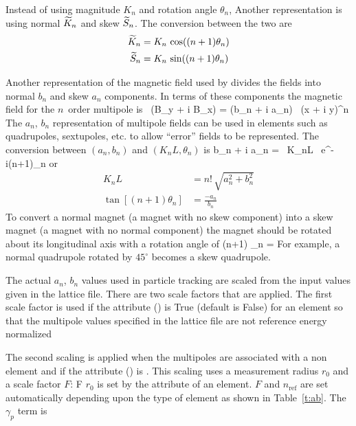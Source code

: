 Instead of using magnitude $K_n$ and rotation angle $\theta_n$,
Another representation is using normal $\widetilde K_n$ and skew $\widetilde
S_n$. The conversion between the two are
\begin{align}
  \widetilde K_n  &= K_n \, \cos((n + 1) \theta_n) \nonumber \\
  \widetilde S_n &= K_n \, \sin((n + 1) \theta_n) 
\end{align}

Another representation of the magnetic field used by \bmad divides
the fields into normal $b_n$ and skew $a_n$ components. In terms of
these components the magnetic field for the $n$\Th\ order multipole is
\Begineq
   \, (B_y + i B_x) = (b_n + i a_n) \, (x + i y)^n
  \label{qlpbb}
\Endeq
The $a_n$, $b_n$ representation of multipole fields can be used in elements such as
quadrupoles, sextupoles, etc. to allow ``error'' fields to be represented.  
The conversion between $(a_n, b_n)$ and $(K_nL, \theta_n)$ is
\Begineq
  b_n + i a_n =  \, K_nL \, e^{-i(n+1)\theta_n}
\Endeq
or
\begin{align}
  K_n L &= n! \, \sqrt{a_n^2 + b_n^2} \\
  \tan[(n+1) \theta_n] &= \frac{-a_n}{b_n}
\end{align}
To convert a normal magnet (a magnet with no skew component) into a skew
magnet (a magnet with no normal component) the magnet should be rotated
about its longitudinal axis with a rotation angle of
\Begineq
  (n+1) \theta_n = 
\Endeq
For example, a normal quadrupole rotated by $45^\circ$ becomes a
skew quadrupole.

The actual $a_n$, $b_n$ values used in particle tracking are scaled from the input values given in
the lattice file. There are two scale factors that are applied. The first scale factor is used if
the  attribute () is True (default is False) for an element so
that the multipole values specified in the lattice file are not reference energy normalized
\Begineq
  \bigl[ a_n, b_n \bigr] \longrightarrow
  \bigl[ a_n, b_n \bigr] \cdot {}
  \label{ababq}
\Endeq

The second scaling is applied when the multipoles are associated with a non
 element and if the  attribute () is
. This scaling uses a measurement radius $r_0$ and a scale factor $F$:
\Begineq
  \bigl[ a_n, b_n \bigr] \longrightarrow
  \bigl[ a_n, b_n \bigr]
  \cdot F \cdot {}
  \label{ababf}
\Endeq
$r_0$ is set by the  attribute of an element. $F$ and $n_\text{ref}$ are set
automatically depending upon the type of element as shown in Table~\ref{t:ab}. The
$\gamma_p$ term is

